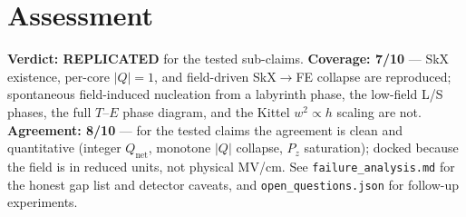 \documentclass[11pt]{article}
\begin{document}
\section{Assessment}
\textbf{Verdict: REPLICATED} for the tested sub-claims.
\textbf{Coverage: 7/10} --- SkX existence, per-core $|Q|=1$, and field-driven
SkX$\to$FE collapse are reproduced; spontaneous field-induced nucleation from a
labyrinth phase, the low-field L/S phases, the full $T$--$E$ phase diagram, and
the Kittel $w^2\propto h$ scaling are not.
\textbf{Agreement: 8/10} --- for the tested claims the agreement is clean and
quantitative (integer $Q_{\text{net}}$, monotone $|Q|$ collapse, $P_z$
saturation); docked because the field is in reduced units, not physical MV/cm.
See \texttt{failure\_analysis.md} for the honest gap list and detector caveats,
and \texttt{open\_questions.json} for follow-up experiments.
\end{document}
